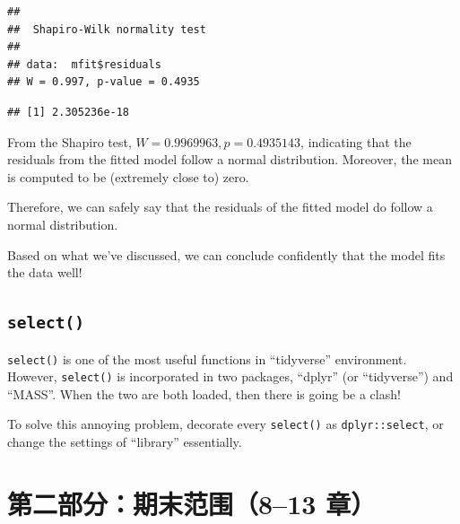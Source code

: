 \documentclass[
]{ctexart}
\newenvironment{Shaded}{\begin{snugshade}}{\end{snugshade}}
\newcommand{\FunctionTok}[1]{\textcolor[rgb]{0.13,0.29,0.53}{\textbf{#1}}}
\newcommand{\NormalTok}[1]{#1}
\newcommand{\SpecialCharTok}[1]{\textcolor[rgb]{0.81,0.36,0.00}{\textbf{#1}}}
\begin{document}
\begin{Shaded}
\end{Shaded}

\begin{verbatim}
## 
##  Shapiro-Wilk normality test
## 
## data:  mfit$residuals
## W = 0.997, p-value = 0.4935
\end{verbatim}

\begin{Shaded}
\end{Shaded}

\begin{verbatim}
## [1] 2.305236e-18
\end{verbatim}

From the Shapiro test, \(W = 0.9969963,p=0.4935143\), indicating that
the residuals from the fitted model follow a normal distribution.
Moreover, the mean is computed to be (extremely close to) zero.

Therefore, we can safely say that the residuals of the fitted model do
follow a normal distribution.

Based on what we've discussed, we can conclude confidently that the
model fits the data well!

\hypertarget{select}{%
\subsection{\texorpdfstring{\texttt{select()}}{select()}}\label{select}}

\texttt{select()} is one of the most useful functions in ``tidyverse''
environment. However, \texttt{select()} is incorporated in two packages,
``dplyr'' (or ``tidyverse'') and ``MASS''. When the two are both loaded,
then there is going be a clash!

To solve this annoying problem, decorate every \texttt{select()} as
\texttt{dplyr::select}, or change the settings of ``library''
essentially.

\newpage

\hypertarget{ux7b2cux4e8cux90e8ux5206ux671fux672bux8303ux56f4813-ux7ae0}{%
\section{第二部分：期末范围（8--13
章）}\label{ux7b2cux4e8cux90e8ux5206ux671fux672bux8303ux56f4813-ux7ae0}}
\end{document}
